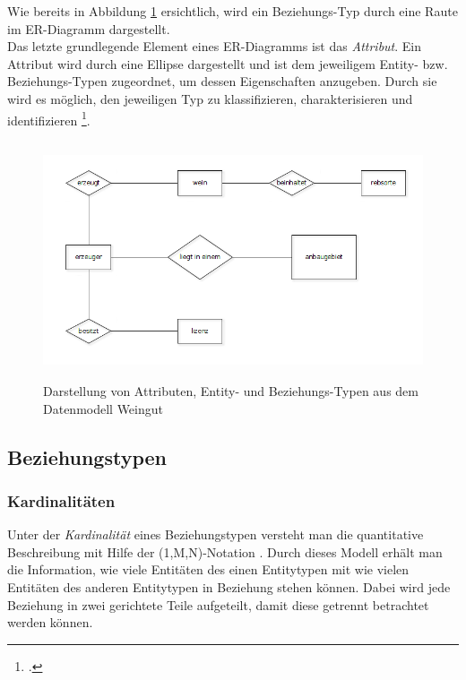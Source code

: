 \noindent
Wie bereits in Abbildung \ref{Typebene} ersichtlich, wird ein Beziehungs-Typ durch eine Raute im ER-Diagramm dargestellt.
\\

\noindent
Das letzte grundlegende Element eines ER-Diagramms ist das \textit{Attribut}. Ein Attribut wird durch eine Ellipse dargestellt und ist dem jeweiligem Entity- bzw. Beziehungs-Typen zugeordnet, um dessen Eigenschaften anzugeben. Durch sie wird es möglich, den jeweiligen Typ zu klassifizieren, charakterisieren und identifizieren \footcite{taschenbuch}.

\begin{figure}[!h]
	\begin{center}
		\includegraphics[width=14cm,height=7cm]{images/typebeneBsp.png}
		\caption{Darstellung von Attributen, Entity- und Beziehungs-Typen aus dem Datenmodell Weingut}
		\label{Typebene}
	\end{center}
\end{figure}

\subsection{Beziehungstypen}
\prc
\subsubsection{Kardinalitäten}

Unter der \textit{Kardinalität} eines Beziehungstypen versteht man die quantitative Beschreibung mit Hilfe der (1,M,N)-Notation \footnotemark[3]. Durch dieses Modell erhält man die Information, wie viele Entitäten des einen Entitytypen mit wie vielen Entitäten des anderen Entitytypen in Beziehung stehen können. Dabei wird jede Beziehung in zwei gerichtete Teile aufgeteilt, damit diese getrennt betrachtet werden können.
\\

